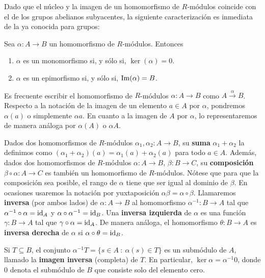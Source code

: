 Dado que el núcleo y la imagen de un homomorfismo de $R$-módulos coincide con
el de los grupos abelianos subyacentes, la siguiente caracterización es
inmediata de la ya conocida para grupos:

\begin{proposicion}
	Sea $\alpha: A \to B$ un homomorfismo de $R$-módulos. Entonces
	\begin{enumerate}
		\item $\alpha$ es un monomorfismo si, y sólo si, $\ker(\alpha) = 0$.
		\item $\alpha$ es un epimorfismo si, y sólo si, $\operatorname{Im}(\alpha) = B$.
	\end{enumerate}
\end{proposicion}

Es frecuente escribir el homomorfismo de $R$-módulos $\alpha: A \rightarrow B$
como $A \xrightarrow{\alpha} B$. Respecto a la notación de la imagen de un
elemento $a \in A$ por $\alpha$, pondremos $\alpha(a)$ o simplemente $\alpha
	a$. En cuanto a la imagen de $A$ por $\alpha$, lo representaremos de manera
análoga por $\alpha(A)$ o $\alpha A$.

Dados dos homomorfismos de $R$-módulos $\alpha_1, \alpha_2 : A \rightarrow B$,
su \textbf{suma} $\alpha_1 + \alpha_2$ la definimos como $(\alpha_1 +
	\alpha_2)(a) = \alpha_1(a) + \alpha_2(a)$ para todo $a \in A$. Además, dados
dos homomorfismos de $R$-módulos $\alpha: A \rightarrow B$, $\beta: B
	\rightarrow C$, su \textbf{composición} $\beta \circ \alpha: A \rightarrow C$
es también un homomorfismo de $R$-módulos. Nótese que para que la composición
sea posible, el rango de $\alpha$ tiene que ser igual al dominio de $\beta$. En
ocasiones usaremos la notación por yuxtaposición $\alpha\beta = \alpha \circ
	\beta$. Llamaremos \textbf{inversa} (por ambos lados) de $\alpha : A
	\rightarrow B$ al homomorfismo $\alpha^{-1} : B \rightarrow A$ tal que
$\alpha^{-1} \circ \alpha = \operatorname{id}_A$ y $\alpha \circ \alpha^{-1} = \operatorname{id}_B$. Una
\textbf{inversa izquierda} de $\alpha$ es una función $\gamma: B \rightarrow A$
tal que $\gamma \circ \alpha = \operatorname{id}_A$. De manera análoga, el homomorfismo $\theta : B \to A$ es \textbf{inversa derecha} de $\alpha$ si $\alpha \circ \theta = \operatorname{id}_B$.

Si \(T \subseteq B\), el conjunto \(\alpha^{-1}T = \{ s \in A \ : \ \alpha(s)
\in T \} \) es un submódulo de \(A\), llamado la \textbf{imagen inversa}
(completa) de \(T\). En particular, \(\ker \alpha = \alpha^{-1}0\), donde \(0\)
denota el submódulo de \(B\) que consiste solo del elemento cero.

